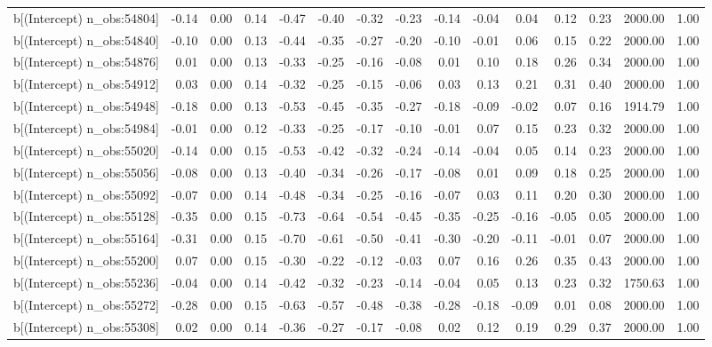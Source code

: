\begin{table}[ht]
\begin{tabular}{rrrrrrrrrrrrrrr}
  b[(Intercept) n\_obs:54804] & -0.14 & 0.00 & 0.14 & -0.47 & -0.40 & -0.32 & -0.23 & -0.14 & -0.04 & 0.04 & 0.12 & 0.23 & 2000.00 & 1.00 \\ 
  b[(Intercept) n\_obs:54840] & -0.10 & 0.00 & 0.13 & -0.44 & -0.35 & -0.27 & -0.20 & -0.10 & -0.01 & 0.06 & 0.15 & 0.22 & 2000.00 & 1.00 \\ 
  b[(Intercept) n\_obs:54876] & 0.01 & 0.00 & 0.13 & -0.33 & -0.25 & -0.16 & -0.08 & 0.01 & 0.10 & 0.18 & 0.26 & 0.34 & 2000.00 & 1.00 \\ 
  b[(Intercept) n\_obs:54912] & 0.03 & 0.00 & 0.14 & -0.32 & -0.25 & -0.15 & -0.06 & 0.03 & 0.13 & 0.21 & 0.31 & 0.40 & 2000.00 & 1.00 \\ 
  b[(Intercept) n\_obs:54948] & -0.18 & 0.00 & 0.13 & -0.53 & -0.45 & -0.35 & -0.27 & -0.18 & -0.09 & -0.02 & 0.07 & 0.16 & 1914.79 & 1.00 \\ 
  b[(Intercept) n\_obs:54984] & -0.01 & 0.00 & 0.12 & -0.33 & -0.25 & -0.17 & -0.10 & -0.01 & 0.07 & 0.15 & 0.23 & 0.32 & 2000.00 & 1.00 \\ 
  b[(Intercept) n\_obs:55020] & -0.14 & 0.00 & 0.15 & -0.53 & -0.42 & -0.32 & -0.24 & -0.14 & -0.04 & 0.05 & 0.14 & 0.23 & 2000.00 & 1.00 \\ 
  b[(Intercept) n\_obs:55056] & -0.08 & 0.00 & 0.13 & -0.40 & -0.34 & -0.26 & -0.17 & -0.08 & 0.01 & 0.09 & 0.18 & 0.25 & 2000.00 & 1.00 \\ 
  b[(Intercept) n\_obs:55092] & -0.07 & 0.00 & 0.14 & -0.48 & -0.34 & -0.25 & -0.16 & -0.07 & 0.03 & 0.11 & 0.20 & 0.30 & 2000.00 & 1.00 \\ 
  b[(Intercept) n\_obs:55128] & -0.35 & 0.00 & 0.15 & -0.73 & -0.64 & -0.54 & -0.45 & -0.35 & -0.25 & -0.16 & -0.05 & 0.05 & 2000.00 & 1.00 \\ 
  b[(Intercept) n\_obs:55164] & -0.31 & 0.00 & 0.15 & -0.70 & -0.61 & -0.50 & -0.41 & -0.30 & -0.20 & -0.11 & -0.01 & 0.07 & 2000.00 & 1.00 \\ 
  b[(Intercept) n\_obs:55200] & 0.07 & 0.00 & 0.15 & -0.30 & -0.22 & -0.12 & -0.03 & 0.07 & 0.16 & 0.26 & 0.35 & 0.43 & 2000.00 & 1.00 \\ 
  b[(Intercept) n\_obs:55236] & -0.04 & 0.00 & 0.14 & -0.42 & -0.32 & -0.23 & -0.14 & -0.04 & 0.05 & 0.13 & 0.23 & 0.32 & 1750.63 & 1.00 \\ 
  b[(Intercept) n\_obs:55272] & -0.28 & 0.00 & 0.15 & -0.63 & -0.57 & -0.48 & -0.38 & -0.28 & -0.18 & -0.09 & 0.01 & 0.08 & 2000.00 & 1.00 \\ 
  b[(Intercept) n\_obs:55308] & 0.02 & 0.00 & 0.14 & -0.36 & -0.27 & -0.17 & -0.08 & 0.02 & 0.12 & 0.19 & 0.29 & 0.37 & 2000.00 & 1.00 \\ 

\end{tabular}
\end{table}
